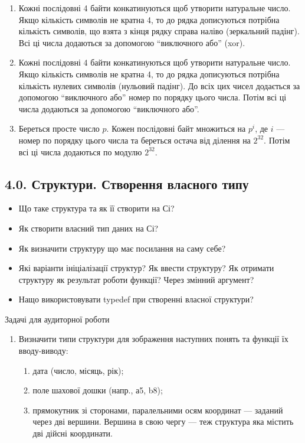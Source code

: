 \documentclass[]{article}
\makeatletter
\newcommand{\xslalph}[1]{\expandafter\@xslalph\csname c@#1\endcsname}
\newcommand{\@xslalph}[1]{%
    \ifcase#1\or а\or б\or в\or г\or д\or e\or є\or ж\or з\or i%
    \or й\or к\or л\or м\or н\or о\or п\or р\or с\or т%
    \or у\or ф\or х\or ц\or ч\or ш\or ю\or я\or аа\or бб\or вв%
    \else\@ctrerr\fi%
}
\makeatother
\begin{document}
\begin{enumerate}
\begin{enumerate}[label=\xslalph*)]
\begin{enumerate}
\begin{enumerate}[label=\xslalph*)]
\begin{enumerate}[label=\xslalph*)]
\item Кожні послідовні 4 байти конкатинуються щоб утворити натуральне
число. Якщо кількість символів не кратна 4, то до рядка дописуються
потрібна кількість символів, що взята з кінця рядку справа наліво
(зеркальний падінг). Всі ці числа додаються за допомогою ``виключного
або'' (xor).
\item Кожні послідовні 4 байти конкатинуються щоб утворити натуральне
число. Якщо кількість символів не кратна 4, то до рядка дописуються
потрібна кількість нулевих символів (нульовий падінг). До всіх цих чисел
додається за допомогою ``виключного або'' номер по порядку цього числа.
Потім всі ці числа додаються за допомогою ``виключного або''.
\item Береться просте число $p$. Кожен послідовні байт множиться на $p^{i}$,
 де $i$ --- номер по порядку цього числа та береться
остача від ділення на $2^{32}$. Потім всі ці числа додаються по модулю $2^{32}$.
\end{enumerate}


\newpage
\subsection{4.0. Структури. Створення власного типу}
\setcounter{subsection}{1}

\begin{itemize}
\item Що таке структура та як її створити на Сі?
\item Як створити власний тип даних на Сі?
\item Як визначити структуру що має посилання на саму себе?
\item Які варіанти ініціалізації структур? Як ввести структуру? Як отримати
структуру як результат роботи функції? Через змінний аргумент?
\item Нащо використовувати typedef при створенні власної структури?
\end{itemize}

Задачі для аудиторної роботи

\begin{enumerate}
\def\labelenumi{\arabic{enumi})}
\item
  Визначити типи структури для зображення наступних понять та функції їх вводу-виводу:
 \begin{enumerate}[label=\xslalph*)]
 \item дата (число, місяць, рік);
 \item поле шахової дошки (напр., а5, b8);
 \item прямокутник зі сторонами, паралельними осям координат --- заданий через дві вершини.
Вершина в свою чергу --- теж структура яка містить дві дійсні координати.
 \end{enumerate}


\end{enumerate}
\end{enumerate}
\end{enumerate}
\end{enumerate}
\end{enumerate}
\end{document}
